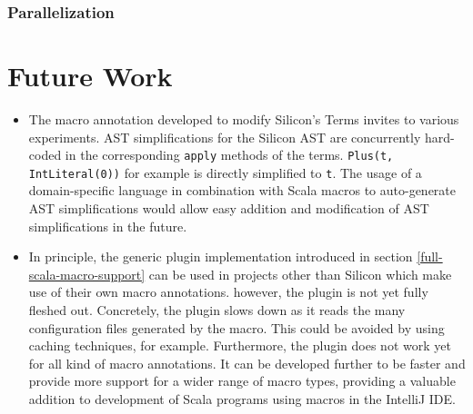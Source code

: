 \documentclass[11pt]{article}
\begin{document}
    \subsubsection{Parallelization}


    \newpage
    \section{Future Work}

    \begin{itemize}
        \item The macro annotation developed to modify Silicon's Terms
            invites to various experiments. AST simplifications
            for the Silicon AST are concurrently hard-coded in the corresponding \texttt{apply}
            methods of the terms. \texttt{Plus(t, IntLiteral(0))} for example is directly
            simplified to \texttt{t}.
            The usage of a domain-specific language in combination with Scala macros to
            auto-generate AST
            simplifications would allow easy addition and modification
            of AST simplifications in the future. 
        \item In principle, the generic plugin implementation introduced in
            section \ref{full-scala-macro-support} can be used in projects other
            than Silicon which make use of their own macro annotations.
            however, the plugin is not yet fully fleshed out. Concretely,
            the plugin slows down as it reads the many configuration 
            files generated by the macro. This could be avoided by
            using caching techniques, for example. 
            Furthermore, the plugin does not work yet for
            all kind of macro annotations.
            It can be developed
            further to be faster and provide more support for a
            wider range of macro types, providing a valuable addition to
            development of Scala programs using macros in the IntelliJ IDE.
    \end{itemize}

    \newpage
\end{document}
